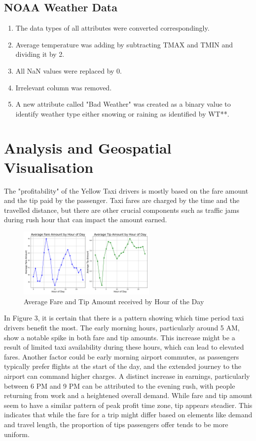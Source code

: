 \documentclass[11pt]{article}
\begin{document}
\subsection{NOAA Weather Data}
\begin{enumerate} 
    \item The data types of all attributes were converted correspondingly.
    \item Average temperature was adding by subtracting TMAX and TMIN and dividing it by 2.
    \item All NaN values were replaced by 0.
    \item Irrelevant column was removed.
    \item A new attribute called "Bad Weather" was created as a binary value to identify weather type either snowing or raining as identified by WT**.
\end{enumerate} 

\section{Analysis and Geospatial Visualisation}
The "profitability" of the Yellow Taxi drivers is mostly based on the fare amount and the tip paid by the passenger. Taxi fares are charged by the time and the travelled distance, but there are other crucial components such as traffic jams during rush hour that can impact the amount earned. 

\begin{figure}[H]
    \includegraphics[width=0.6\textwidth]{plots/Avg amount by hour of day.png}
    \centering
    \caption{Average Fare and Tip Amount received by Hour of the Day} %
\end{figure}
In Figure 3, it is certain that there is a pattern showing which time period taxi drivers benefit the most. The early morning hours, particularly around 5 AM, show a notable spike in both fare and tip amounts. This increase might be a result of limited taxi availability during these hours, which can lead to elevated fares. Another factor could be early morning airport commutes, as passengers typically prefer flights at the start of the day, and the extended journey to the airport can command higher charges. A distinct increase in earnings, particularly between 6 PM and 9 PM can be attributed to the evening rush, with people returning from work and a heightened overall demand. While fare and tip amount seem to have a similar pattern of peak profit time zone, tip appears steadier. This indicates that while the fare for a trip might differ based on elements like demand and travel length, the proportion of tips passengers offer tends to be more uniform.
\end{document}
